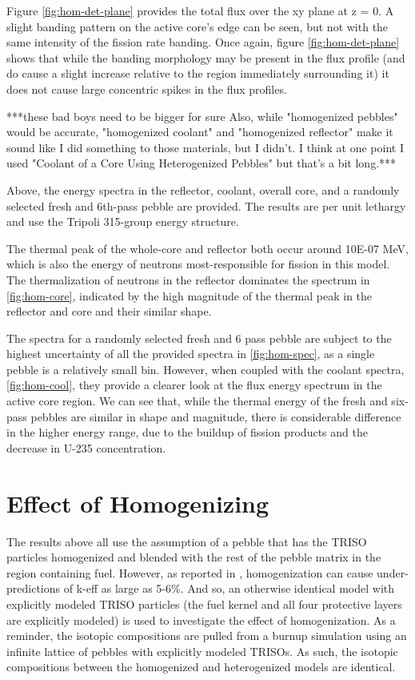 Figure \ref{fig:hom-det-plane} provides the total flux over the xy plane at z = 0.  A slight banding pattern on the active core's edge can be seen, but not with the same intensity of the fission rate banding.  Once again, figure \ref{fig:hom-det-plane} shows that while the banding morphology may be present in the flux profile (and do cause a slight increase relative to the region immediately surrounding it) it does not cause large concentric spikes in the flux profiles.



***these bad boys need to be bigger for sure  Also, while "homogenized pebbles" would be accurate, "homogenized coolant" and "homogenized reflector" make it sound like I did something to those materials, but I didn't.  I think at one point I used "Coolant of a Core Using Heterogenized Pebbles" but that's a bit long.***

Above, the energy spectra in the reflector, coolant, overall core, and a randomly selected fresh and 6th-pass pebble are provided.  The results are per unit lethargy and use the Tripoli 315-group energy structure.

The thermal peak of the whole-core and reflector both occur around 10E-07 MeV, which is also the energy of neutrons most-responsible for fission in this model.  The thermalization of neutrons in the reflector dominates the spectrum in \ref{fig:hom-core}, indicated by the high magnitude of the thermal peak in the reflector and core and their similar shape.

The spectra for a randomly selected fresh and 6 pass pebble are subject to the highest uncertainty of all the provided spectra in \ref{fig:hom-spec}, as a single pebble is a relatively small bin.  However, when coupled with the coolant spectra, \ref{fig:hom-cool}, they provide a clearer look at the flux energy spectrum in the active core region.  We can see that, while the thermal energy of the fresh and six-pass pebbles are similar in shape and magnitude, there is considerable difference in the higher energy range, due to the buildup of fission products and the decrease in U-235 concentration.


\section{Effect of Homogenizing}

The results above all use the assumption of a pebble that has the TRISO particles homogenized and blended with the rest of the pebble matrix in the region containing fuel.  However, as reported in \cite{brown_stochastic_2005}, homogenization can cause under-predictions of k-eff as large as 5-6\%.  And so, an otherwise identical model with explicitly modeled TRISO particles (the fuel kernel and all four protective layers are explicitly modeled) is used to investigate the effect of homogenization.  As a reminder, the isotopic compositions are pulled from a burnup simulation using an infinite lattice of pebbles with explicitly modeled TRISOs.  As such, the isotopic compositions between the homogenized and heterogenized models are identical.


